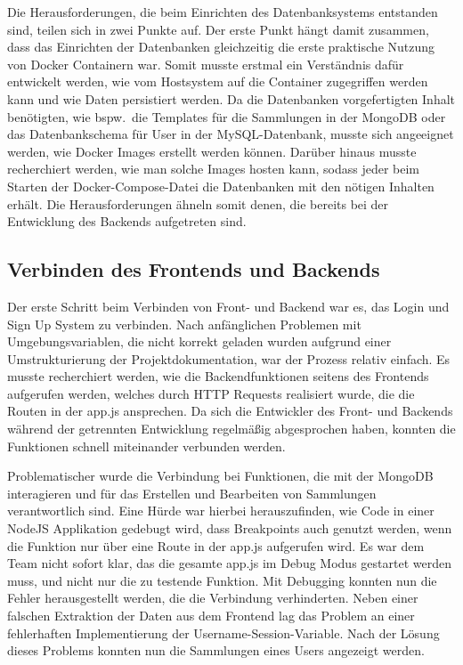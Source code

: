 Die Herausforderungen, die beim Einrichten des Datenbanksystems entstanden sind, teilen sich in zwei Punkte auf.
Der erste Punkt hängt damit zusammen, dass das Einrichten der Datenbanken gleichzeitig die erste praktische Nutzung von Docker Containern war.
Somit musste erstmal ein Verständnis dafür entwickelt werden, wie vom Hostsystem auf die Container zugegriffen werden kann und wie Daten persistiert werden.
Da die Datenbanken vorgefertigten Inhalt benötigten, wie bspw.\ die Templates für die Sammlungen in der MongoDB oder das Datenbankschema für User in der MySQL-Datenbank, musste sich angeeignet werden, wie Docker Images erstellt werden können.
Darüber hinaus musste recherchiert werden, wie man solche Images hosten kann, sodass jeder beim Starten der Docker-Compose-Datei die Datenbanken mit den nötigen Inhalten erhält.
Die Herausforderungen ähneln somit denen, die bereits bei der Entwicklung des Backends aufgetreten sind.

\subsection{Verbinden des Frontends und Backends}\label{subsec:verbinden-des-frontends-und-backends}

Der erste Schritt beim Verbinden von Front- und Backend war es, das Login und Sign Up System zu verbinden.
Nach anfänglichen Problemen mit Umgebungsvariablen, die nicht korrekt geladen wurden aufgrund einer Umstrukturierung der Projektdokumentation, war der Prozess relativ einfach.
Es musste recherchiert werden, wie die Backendfunktionen seitens des Frontends aufgerufen werden, welches durch HTTP Requests realisiert wurde, die die Routen in der app.js ansprechen.
Da sich die Entwickler des Front- und Backends während der getrennten Entwicklung regelmäßig abgesprochen haben, konnten die Funktionen schnell miteinander verbunden werden.

Problematischer wurde die Verbindung bei Funktionen, die mit der MongoDB interagieren und für das Erstellen und Bearbeiten von Sammlungen verantwortlich sind.
Eine Hürde war hierbei herauszufinden, wie Code in einer NodeJS Applikation gedebugt wird, dass Breakpoints auch genutzt werden, wenn die Funktion nur über eine Route in der app.js aufgerufen wird.
Es war dem Team nicht sofort klar, das die gesamte app.js im Debug Modus gestartet werden muss, und nicht nur die zu testende Funktion.
Mit Debugging konnten nun die Fehler herausgestellt werden, die die Verbindung verhinderten.
Neben einer falschen Extraktion der Daten aus dem Frontend lag das Problem an einer fehlerhaften Implementierung der Username-Session-Variable.
Nach der Lösung dieses Problems konnten nun die Sammlungen eines Users angezeigt werden.


